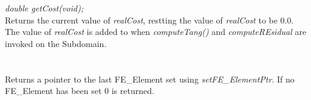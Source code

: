 {\em double getCost(void); }\\
Returns the current value of {\em realCost}, restting the value of {\em realCost} to be 0.0. The
value of {\em realCost} is added to when {\em computeTang()} and {\em computeREsidual} are invoked on the
Subdomain. \\

  \\
\\
Returns a pointer to the last FE\_Element set using {\em
setFE\_ElementPtr}. If no FE\_Element has been set $0$ is returned. \\






